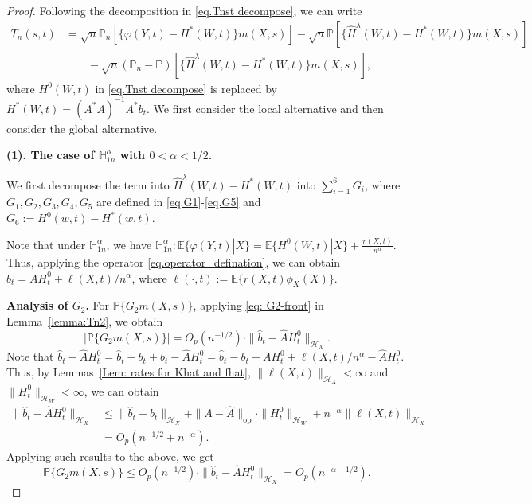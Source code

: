 \documentclass[
  12pt]{article}
\def\mH{\mathbb{H}}
\def\mP{\mathbb{P}}
\begin{document}
\powerhypothesis*
\begin{proof}
Following the decomposition in \eqref{eq.Tnst decompose}, we can write
\begin{equation}\label{eq.Tnst decompose_H1}
\begin{aligned}
	T_n(s,t)&=\sqrt{n}\mathbb{P}_n\left[ \{\varphi (Y,t)-H^*(W,t)\}m(X,s) \right] -\sqrt{n}\mathbb{P} \left[ \{\widehat{H}^{\lambda}(W,t)-H^*(W,t)\}m(X,s) \right]\\
	&\qquad -\sqrt{n}(\mathbb{P}_n-\mathbb{P} )\left[\{ \widehat{H}^{\lambda}(W,t)-H^*(W,t)\}m(X,s) \right],
\end{aligned}
\end{equation}
where $H^0(W,t)$ in \eqref{eq.Tnst decompose} is replaced by $H^*(W,t)=( A^*A)^{-1}A^*b_t$. We first consider the local alternative and then consider the global alternative.


\noindent\textbf{(1). The case of $\mH_{1n}^\alpha$ with 
$0<\alpha<1/2$.} 

We first decompose the term into $\widehat{H}^{\lambda}(W,t)-H^*(W,t)$ into $\sum_{i=1}^6 G_i$, where $G_1,G_2,G_3,G_4,G_5$ are defined in \eqref{eq.G1}-\eqref{eq.G5} and $G_6:=H^0( w,t ) -H^*( w,t )$. 

Note that under $\mH_{1n}^\alpha$, we have $    \mathbb H^\alpha_{1n}: \mathbb{E}\{\varphi(Y,t)|X\}= \mathbb{E}\{H^0(W,t)|X\}+\frac{r(X,t)}{n^\alpha}$. Thus, applying the operator \ref{eq.operator_defination}, we can obtain $b_t=AH^0_t+\ell(X,t)/n^{\alpha}$, where $\ell(\cdot,t):=\mathbb{E}\{r(X,t)\phi_X(X)\}$.

\textbf{Analysis of $G_2$.} For $\mP\{G_2m(X,s)\}$, applying \eqref{eq: G2-front} in Lemma~\ref{lemma:Tn2},  we obtain
$$
|\mathbb{P}\{ G_2m(X,s)\}| = O_p(n^{-1/2})\cdot \|\widehat{b}_t-\widehat{A}H^0_t\|_{\mathcal{H}_X}.
$$
Note that $\widehat{b}_t-\widehat{A}H^0_t=\widehat{b}_t-b_t+b_t-\widehat{A}H_{t}^{0}=\widehat{b}_t-b_t+AH^0_t+\ell(X,t)/n^{\alpha}-\widehat{A}H_{t}^{0}$. Thus, by Lemmas~\ref{Lem: rates for Khat and fhat}, $\| \ell(X,t)\|_{\mathcal{H}_X}<\infty$ and $\|H_{t}^{0}\|_{\mathcal{H}_W}<\infty$, we can obtain
\begin{equation}
\begin{aligned}\label{eq. f_hat-K_hatH_H1}
    \|\widehat{b}_t-\widehat{A}H^0_t\|_{\mathcal{H}_X}&\le \|\widehat{b}_t-b_t\|_{\mathcal{H}_X}+ \|A-\widehat{A}\|_{\mathrm{op}}\cdot\|H_{t}^{0}\|_{\mathcal{H}_W}+n^{-\alpha}\| \ell(X,t)\|_{\mathcal{H}_X}\\
    & =  O_p(n^{-1/2}+n^{-\alpha}).
\end{aligned}
\end{equation}
Applying such results to the above, we get
$$
\mP\{G_2m(X,s)\}
\le O_p(n^{-1/2})\cdot \|\widehat{b}_t-\widehat{A}H^0_t\|_{\mathcal{H}_X} =  O_p(n^{-\alpha-1/2}).
$$


\end{proof}
\end{document}
